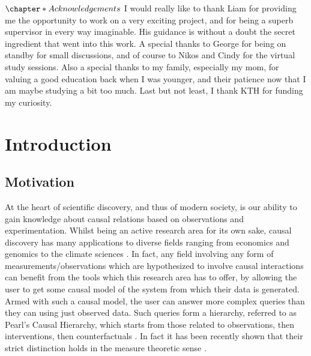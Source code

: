 \documentclass{tufte-book}
\begin{document}
 \newpage 

\(\chapter*{Acknowledgements}\)
I would really like to thank Liam for providing me the opportunity to work on a very exciting project, and for being a superb supervisor in every way imaginable. His guidance is without a doubt the secret ingredient that went into this work. A special thanks to George for being on standby for small discussions, and of course to Nikos and Cindy for the virtual study sessions. Also a special thanks to my family, especially my mom, for valuing a good education back when I was younger, and their patience now that I am maybe studying a bit too much. Last but not least, I thank KTH for funding my curiosity.

 \newpage 


\setcounter{tocdepth}{1}
\tableofcontents

 \newpage 

\chapter{Introduction}
\label{sec:org2d8fe78}
\label{sec:Intro}
\section{Motivation}
\label{sec:org2825f2c}
At the heart of scientific discovery, and thus of modern society, is our ability to gain knowledge about causal relations based on observations and experimentation. Whilst being an active research area for its own sake, causal discovery has many applications to diverse fields ranging from economics  \cite{huang-2019-causal-discov} and genomics \cite{hu-2018-applic-causal} to the climate sciences \cite{runge-2019-infer-causat}. In fact, any field involving any form of measurements/observations which are hypothesized to involve causal interactions can benefit from the tools which this research area has to offer, by allowing the user to get some causal model of the system from which their data is generated. Armed with such a causal model, the user can answer more complex queries than they can using just observed data. Such queries form a hierarchy, referred to as Pearl's Causal Hierarchy, which starts from those related to observations, then interventions, then counterfactuals \cite{pearl-2018-book-why}. In fact it has been recently shown that their strict distinction holds in the measure theoretic sense \cite{elias-2020-pearl-hierar}.
\end{document}
